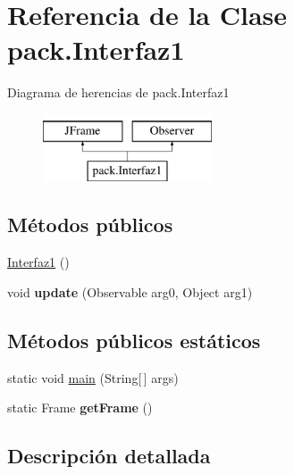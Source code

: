 \hypertarget{classpack_1_1_interfaz1}{}\section{Referencia de la Clase pack.\+Interfaz1}
\label{classpack_1_1_interfaz1}
Diagrama de herencias de pack.\+Interfaz1\begin{figure}[H]
\begin{center}
\leavevmode
\includegraphics[height=2.000000cm]{classpack_1_1_interfaz1}
\end{center}
\end{figure}
\subsection*{Métodos públicos}
\begin{DoxyCompactItemize}
\item 
\mbox{\hyperlink{classpack_1_1_interfaz1_a1e7e3d091113cf6569221d4c5dad40bb}{Interfaz1}} ()
\item 
\mbox{\label{classpack_1_1_interfaz1_ac715dcc441264691d5f655a1f809a01c}} 
void {\bfseries update} (Observable arg0, Object arg1)
\end{DoxyCompactItemize}
\subsection*{Métodos públicos estáticos}
\begin{DoxyCompactItemize}
\item 
static void \mbox{\hyperlink{classpack_1_1_interfaz1_aa6a2189460a4c501ae7deabb5fd658c8}{main}} (String\mbox{[}$\,$\mbox{]} args)
\item 
\mbox{\label{classpack_1_1_interfaz1_a3213f1d96b611d47b58b6162060e4aa9}} 
static Frame {\bfseries get\+Frame} ()
\end{DoxyCompactItemize}


\subsection{Descripción detallada}


